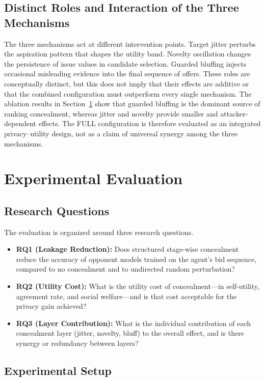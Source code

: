 \documentclass[runningheads]{llncs}
\begin{document}
\subsection{Distinct Roles and Interaction of the Three Mechanisms}

The three mechanisms act at different intervention points. Target jitter perturbs the aspiration pattern that shapes the utility band. Novelty oscillation changes the persistence of issue values in candidate selection. Guarded bluffing injects occasional misleading evidence into the final sequence of offers. These roles are conceptually distinct, but this does not imply that their effects are additive or that the combined configuration must outperform every single mechanism. The ablation results in Section~\ref{sec:experiments} show that guarded bluffing is the dominant source of ranking concealment, whereas jitter and novelty provide smaller and attacker-dependent effects. The FULL configuration is therefore evaluated as an integrated privacy--utility design, not as a claim of universal synergy among the three mechanisms.

\section{Experimental Evaluation}
\label{sec:experiments}

\subsection{Research Questions}

The evaluation is organized around three research questions.
\begin{itemize}
    \item \textbf{RQ1 (Leakage Reduction):} Does structured stage-wise concealment reduce the accuracy of opponent models trained on the agent's bid sequence, compared to no concealment and to undirected random perturbation?
    \item \textbf{RQ2 (Utility Cost):} What is the utility cost of concealment---in self-utility, agreement rate, and social welfare---and is that cost acceptable for the privacy gain achieved?
    \item \textbf{RQ3 (Layer Contribution):} What is the individual contribution of each concealment layer (jitter, novelty, bluff) to the overall effect, and is there synergy or redundancy between layers?
\end{itemize}

\subsection{Experimental Setup}
\end{document}
